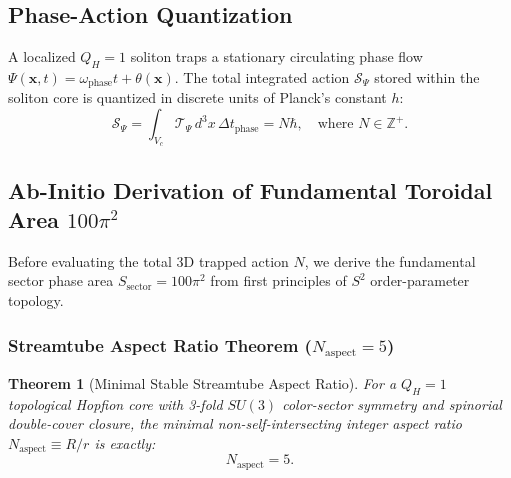 \documentclass[11pt,a4paper]{article}
\newtheorem{thm}{Theorem}
\begin{document}
	\subsection{Phase-Action Quantization}
	A localized $Q_H = 1$ soliton traps a stationary circulating phase flow $\Psi(\mathbf{x}, t) = \omega_{\text{phase}} t + \theta(\mathbf{x})$. The total integrated action $\mathcal{S}_\Psi$ stored within the soliton core is quantized in discrete units of Planck's constant $h$:
	\begin{equation}
		\mathcal{S}_\Psi = \int_{V_c} \mathcal{T}_\Psi \, d^3x \, \Delta t_{\text{phase}} = N \hbar, \quad \text{where } N \in \mathbb{Z}^+.
		\label{eq:action_quantization_def}
	\end{equation}
	
	\subsection{Ab-Initio Derivation of Fundamental Toroidal Area \texorpdfstring{$100\pi^2$}{100 pi^2}}
	\label{sec:derivation_100pi2}
	
	Before evaluating the total 3D trapped action $N$, we derive the fundamental sector phase area $S_{\text{sector}} = 100\pi^2$ from first principles of $S^2$ order-parameter topology.
	
	\subsubsection{Streamtube Aspect Ratio Theorem ($N_{\text{aspect}} = 5$)}
	\begin{thm}[Minimal Stable Streamtube Aspect Ratio]
		For a $Q_H = 1$ topological Hopfion core with 3-fold $SU(3)$ color-sector symmetry and spinorial double-cover closure, the minimal non-self-intersecting integer aspect ratio $N_{\text{aspect}} \equiv R/r$ is exactly:
		\begin{equation}
			N_{\text{aspect}} = 5.
			\label{eq:N_aspect_theorem}
		\end{equation}
	\end{thm}
	
\end{document}
